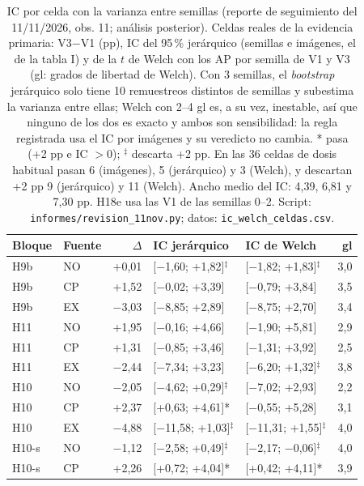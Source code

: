 \begin{table}[H]\centering\footnotesize
\caption{IC por celda con la varianza entre semillas (reporte de seguimiento del 11/11/2026, obs. 11; análisis posterior). Celdas reales de la evidencia primaria: V3$-$V1 (pp), IC del 95\,\% jerárquico (semillas e imágenes, el de la tabla I) y de la $t$ de Welch con los AP por semilla de V1 y V3 (gl: grados de libertad de Welch). Con 3 semillas, el \emph{bootstrap} jerárquico solo tiene 10 remuestreos distintos de semillas y subestima la varianza entre ellas; Welch con 2--4 gl es, a su vez, inestable, así que ninguno de los dos es exacto y ambos son sensibilidad: la regla registrada usa el IC por imágenes y su veredicto no cambia. * pasa (+2 pp e IC $>0$); $^\ddagger$ descarta +2 pp. En las 36 celdas de dosis habitual pasan 6 (imágenes), 5 (jerárquico) y 3 (Welch), y descartan +2 pp 9 (jerárquico) y 11 (Welch). Ancho medio del IC: 4,39, 6,81 y 7,30 pp. H18e usa las V1 de las semillas 0--2. Script: \texttt{informes/revision\_11nov.py}; datos: \texttt{ic\_welch\_celdas.csv}.}\label{tab:s-welch}
\begin{tabular}{@{}llrllr@{}}\toprule
Bloque & Fuente & $\Delta$ & IC jerárquico & IC de Welch & gl \\\midrule
H9b & NO & +0{,}01 & [$-$1{,}60; +1{,}82]$^\ddagger$ & [$-$1{,}82; +1{,}83]$^\ddagger$ & 3{,}0 \\
H9b & CP & +1{,}52 & [$-$0{,}02; +3{,}39] & [$-$0{,}79; +3{,}84] & 3{,}5 \\
H9b & EX & $-$3{,}03 & [$-$8{,}85; +2{,}89] & [$-$8{,}75; +2{,}70] & 3{,}4 \\
H11 & NO & +1{,}95 & [$-$0{,}16; +4{,}66] & [$-$1{,}90; +5{,}81] & 2{,}9 \\
H11 & CP & +1{,}31 & [$-$0{,}85; +3{,}46] & [$-$1{,}31; +3{,}92] & 2{,}5 \\
H11 & EX & $-$2{,}44 & [$-$7{,}34; +3{,}23] & [$-$6{,}20; +1{,}32]$^\ddagger$ & 3{,}8 \\
H10 & NO & $-$2{,}05 & [$-$4{,}62; +0{,}29]$^\ddagger$ & [$-$7{,}02; +2{,}93] & 2{,}2 \\
H10 & CP & +2{,}37 & [+0{,}63; +4{,}61]* & [$-$0{,}55; +5{,}28] & 3{,}1 \\
H10 & EX & $-$4{,}88 & [$-$11{,}58; +1{,}03]$^\ddagger$ & [$-$11{,}31; +1{,}55]$^\ddagger$ & 4{,}0 \\
H10-s & NO & $-$1{,}12 & [$-$2{,}58; +0{,}49]$^\ddagger$ & [$-$2{,}17; $-$0{,}06]$^\ddagger$ & 4{,}0 \\
H10-s & CP & +2{,}26 & [+0{,}72; +4{,}04]* & [+0{,}42; +4{,}11]* & 3{,}9 \\

\end{tabular}
\end{table}
